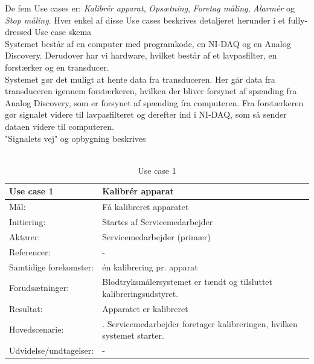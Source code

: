 De fem Use cases er: \textit{Kalibrér apparat}, \textit{Opsætning}, \textit{Foretag måling}, \textit{Alarmér} og \textit{Stop måling}. Hver enkel af disse Use cases beskrives detaljeret herunder i et fully-dressed Use case skema\\
Systemet består af en computer med programkode, en NI-DAQ og en Analog Discovery. Derudover har vi hardware, hvilket består af et lavpasfilter, en forstærker og en transducer.
\\
Systemet gør det muligt at hente data fra transduceren. Her går data fra transduceren igennem forstærkeren, hvilken der bliver forsynet af spænding fra Analog Discovery, som er forsynet af spænding fra computeren. Fra forstærkeren gør signalet videre til lavpasfilteret og derefter ind i NI-DAQ, som så sender dataen videre til computeren. 
\\ 

"Signalets vej" og opbygning beskrives\\\\


\begin{table}[H]
\caption{Use case 1}\label{tab:tabel3}
\begin{tabular}{| l | >{\raggedright\arraybackslash}p{11cm} |}
   \hline
   \textbf{Use case 1} & \textbf{Kalibrér apparat}\\ \hline
   Mål: & Få kalibreret apparatet \\ \hline
   Initiering: & Startes af Servicemedarbejder\\ \hline
   Aktører:& Servicemedarbejder (primær)\\ \hline
   Referencer: & - \\ \hline
   Samtidige forekomster: & én kalibrering pr. apparat \\\hline
   Forudsætninger: & Blodtryksmålersystemet er tændt og tilsluttet kalibreringsudstyret.\\ \hline
   Resultat:& Apparatet er kalibreret\\ \hline
   Hovedscenarie:& 
1. Servicemedarbejder foretager kalibreringen, hvilken systemet starter.\\\hline
Udvidelse/undtagelser: & - \\\hline
\end{tabular}
\end{table}


